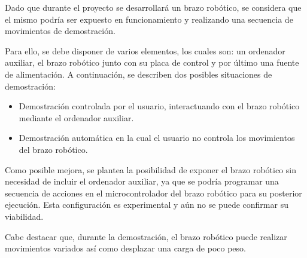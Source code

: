 Dado que durante el proyecto se desarrollará un brazo robótico, se considera que el mismo podría ser expuesto en funcionamiento y realizando una secuencia de movimientos de demostración.

Para ello, se debe disponer de varios elementos, los cuales son: un ordenador auxiliar, el brazo robótico junto con su placa de control y por último una fuente de alimentación. A continuación, se describen dos posibles situaciones de demostración:
\begin{itemize}
    \item Demostración controlada por el usuario, interactuando con el brazo robótico mediante el ordenador auxiliar.
    \item Demostración automática en la cual el usuario no controla los movimientos del brazo robótico.
\end{itemize}

Como posible mejora, se plantea la posibilidad de exponer el brazo robótico sin necesidad de incluir el ordenador auxiliar, ya que se podría programar una secuencia de acciones en el microcontrolador del brazo robótico para  su posterior ejecución. Esta configuración es experimental y aún no se puede confirmar su viabilidad.

Cabe destacar que, durante la demostración, el brazo robótico puede realizar movimientos variados así como desplazar una carga de poco peso.



